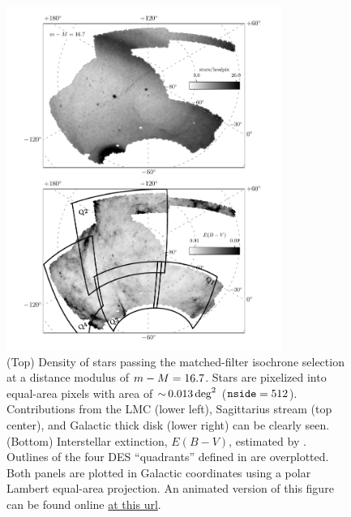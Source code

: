 \documentclass[twocolumn]{aastex61}
\begin{document}
\begin{figure}[ht!]
  \centering
  \includegraphics[width=0.8\textwidth]{density_dust_m16p7_v17p2}
  \caption{(Top) Density of stars passing the matched-filter isochrone selection at a distance modulus of $m - M = 16.7$. Stars are pixelized into equal-area \healpix pixels with area of $ {\sim}\, 0.013 \deg^2$ ($\texttt{nside}=512$). Contributions from the LMC (lower left), Sagittarius stream (top center), and Galactic thick disk (lower right) can be clearly seen.
    (Bottom) Interstellar extinction, $E(B-V)$, estimated by \citet{Schlegel:1998}.
    Outlines of the four DES ``quadrants'' defined in  are overplotted.
    Both panels are plotted in Galactic coordinates using a polar Lambert equal-area projection.
    An animated version of this figure can be found online \href{http://home.fnal.gov/~kadrlica/movies/density_dust_v17p2.gif}{at this url}.
}
  \label{fig:isosel}
\end{figure}
\end{document}
